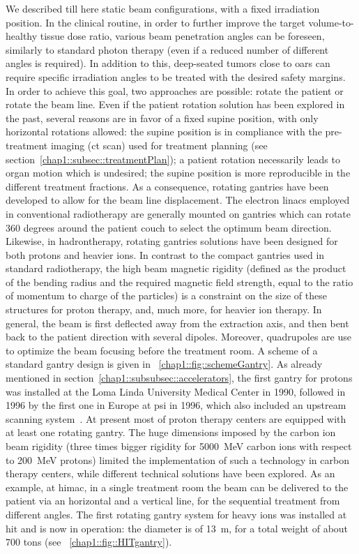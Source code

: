 We described till here static beam configurations,  with a fixed irradiation position. In the clinical routine, in order to further improve the target volume-to-healthy tissue dose ratio, various beam penetration angles can be foreseen, similarly to standard photon therapy (even if a reduced number of different angles is required). In addition to this, deep-seated tumors close to \glspl{oar} can require specific irradiation angles to be treated with the desired safety margins. In order to achieve this goal, two approaches are possible: rotate the patient or rotate the beam line. 
Even if the patient rotation solution has been explored in the past, several reasons are in favor of a fixed supine position, with only horizontal rotations allowed: the supine position is in compliance with the pre-treatment imaging (\gls{ct} scan) used for treatment planning (see section~\ref{chap1::subsec::treatmentPlan}); a patient rotation necessarily leads to organ motion which is undesired; the supine position is more reproducible in the different treatment fractions. As a consequence, rotating gantries have been developed to allow for the beam line displacement.    
The electron linacs employed in conventional radiotherapy are generally mounted on gantries which can rotate 360 degrees around the patient couch to select the optimum beam direction. 
Likewise, in hadrontherapy, rotating gantries solutions have been designed for both protons and heavier ions. In contrast to the compact gantries used in standard radiotherapy, the high beam magnetic rigidity (defined as the product of the bending radius and the required magnetic field strength, equal to the ratio of momentum to charge of the particles) is a constraint on the size of these structures for proton therapy, and, much more, for heavier ion therapy. In general, the beam is first deflected away from the extraction axis, and then bent back to the patient direction with several dipoles. Moreover, quadrupoles are use to optimize the beam focusing before the treatment room. A scheme of a standard gantry design is given in \figurename~\ref{chap1::fig::schemeGantry}. As already mentioned in section~\ref{chap1::subsubsec::accelerators}, the first gantry for protons was installed at the Loma Linda University Medical Center in 1990, followed in 1996 by the first one in Europe at \gls{psi} in 1996, which also included an upstream scanning system~\parencite{Pedroni1995}. At present most of proton therapy centers are equipped with at least one rotating gantry.
The huge dimensions imposed by the carbon ion beam rigidity (three times bigger rigidity for 5000~MeV carbon ions with respect to 200~MeV protons) limited the implementation of such a technology in carbon therapy centers, while different technical solutions have been explored. As an example, at \gls{himac}, in a single treatment room the beam can be delivered to the patient via an horizontal and a vertical line, for the sequential treatment from different angles. The first rotating gantry system for heavy ions was installed at \gls{hit} and is now in operation: the diameter is of 13~m, for a total weight of about 700 tons (see \figurename~\ref{chap1::fig::HITgantry}).

